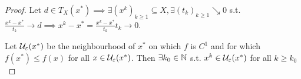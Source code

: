 \begin{proof}
    Let \(d \in T_X(x^*) \implies \exists (x^k)_{k \ge 1} \subseteq X, \exists (t_k)_{k \ge 1} \searrow 0\) s.t. \(\frac{x^k - x^*}{t_k} \to d \implies x^k - x^* = \frac{x^k - x^*}{t_k} t_k \to 0\).

    Let \(\mathcal{U}_\varepsilon(x^*)\) be the neighbourhood of \(x^*\) on which \(f\) is \(C^1\) and for which \(f(x^*) \le f(x)\) for all \(x \in \mathcal{U}_\varepsilon(x^*)\). Then \(\exists k_0 \in \mathbb{N}\) s.t. \(x^k \in \mathcal{U}_\varepsilon(x^*)\) for all \(k \ge k_0\)
\end{proof}